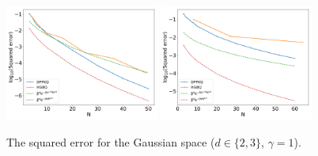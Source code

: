 \documentclass[twoside,11pt]{book}
\numberwithin{theorem}{chapter}
\numberwithin{definition}{chapter}
\numberwithin{proposition}{chapter}
\numberwithin{corollary}{chapter}
\numberwithin{example}{chapter}
\numberwithin{lemma}{chapter}
\begin{document}
\begin{figure}[]
    \centering
\includegraphics[width= 0.45\textwidth]{img/neurips/multiHermite/Gaussian_2D_kernel_scale_1_fig_L.pdf}
\includegraphics[width= 0.45\textwidth]{img/neurips/multiHermite/Gaussian_3D_kernel_scale_1_fig_L.pdf} \\
\caption{The squared error for the Gaussian space ($d \in \{2,3\}$, $\gamma=1$). \label{fig:GaussianResult}}
\end{figure}





\end{document}
